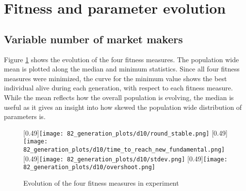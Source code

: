 \section{Fitness and parameter evolution}\label{section:fitness_and_paraeter_evolution}


\subsection{Variable number of market makers}

Figure \ref{fig:d10_evolution_fitness} shows the evolution of the four fitness measures. The population wide mean is plotted along the median and minimum statistics. Since all four fitness measures were minimized, the curve for the minimum value shows the best individual alive during each generation, with respect to each fitness measure. While the mean reflects how the overall population is evolving,  the median is useful as it gives an insight into how skewed the population wide distribution of parameters is. 


\begin{figure}
	\centering
	[0.49\linewidth]{\texttt{[image: 82\_generation\_plots/d10/round\_stable.png]}}
	[0.49\linewidth]{\texttt{[image: 82\_generation\_plots/d10/time\_to\_reach\_new\_fundamental.png]}}
	[0.49\linewidth]{\texttt{[image: 82\_generation\_plots/d10/stdev.png]}}
	[0.49\linewidth]{\texttt{[image: 82\_generation\_plots/d10/overshoot.png]}}
	\caption{Evolution of the four fitness measures in experiment \dten}
	\label{fig:d10_evolution_fitness}
\end{figure}





